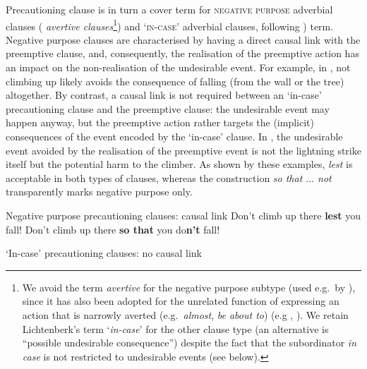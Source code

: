 \documentclass[output=paper,colorlinks,citecolor=brown]{langscibook}
\begin{document}
Precautioning clause is in turn a cover term for \textsc{negative purpose} adverbial clauses ( \textit{avertive clauses}\footnote{We avoid the term \textit{avertive} for the negative purpose subtype (used e.g.\ by \cite{lichtenberk1995,schmidtkebode2009,vuillermet2018a}), since it has also been adopted for the unrelated function of expressing an action that is narrowly averted (e.g.\ \textit{almost}, \textit{be about to}) (e.g \cite{kuteva2000}, \cite{kutevaetal2019}). We retain Lichtenberk's term `\textit{in-case}' for the other clause type (an alternative is ``possible undesirable consequence'') despite the fact that the  subordinator \textit{in case} is not restricted to undesirable events (see below).}) and `\textsc{in-case}' adverbial clauses, following ) term. Negative purpose clauses are characterised by having a direct causal link with the preemptive clause, and, consequently, the realisation of the preemptive action has an impact on the non-realisation of the undesirable event. For example, in , not climbing up likely avoids the consequence of falling (from the wall or the tree) altogether. By contrast, a causal link is not required between an `in-case' precautioning clause and the preemptive clause: the undesirable event may happen anyway, but the preemptive action rather targets the (implicit) consequences of the event encoded by the `in-case' clause. In , the undesirable event avoided by the realisation of the preemptive event is not the lightning strike itself but the potential harm to the climber. As shown by these examples, \textit{lest} is acceptable in both types of clauses, whereas the construction \textit{so that $\ldots$  not} transparently marks negative purpose only.

\ea \textnormal{Negative purpose precautioning clauses: causal link}
\label{ex:intro6} 
\ea\label{ex:intro6a} Don't climb up there \textbf{lest} you fall!
\ex\label{ex:intro6b} Don't climb up there \textbf{so that} you do\textbf{n't} fall!
\z
\z

\ea \textnormal{`In-case' precautioning clauses: no causal link}
\label{ex:intro7}
\label{ex:intro7b} 
\z
\z
\end{document}

